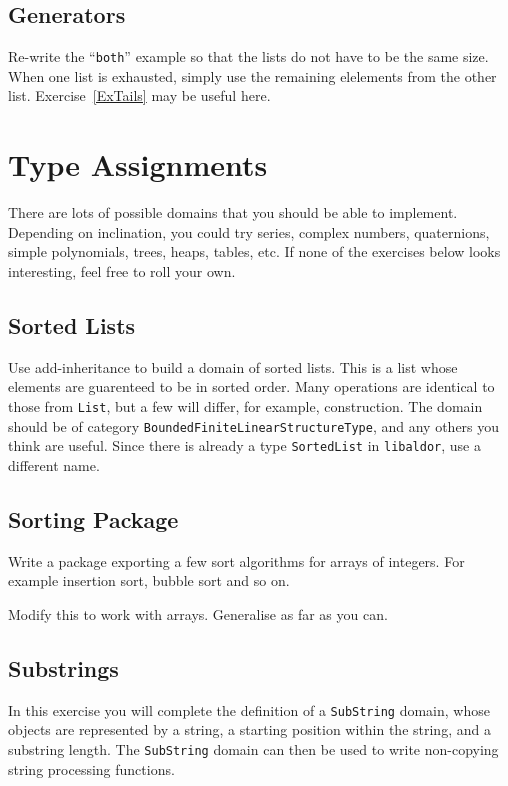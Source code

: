 \documentclass{article}
\newcommand{\libaldor}{{\tt libaldor}}
\begin{document}
\subsection{Generators}
Re-write the ``{\tt both}'' example so that the lists do not have to
be the same size.  When one list is exhausted, simply use the
remaining elelements from the other list.
Exercise~\ref{ExTails} may be useful here. 


\section{Type Assignments}

There are lots of possible domains that you should be able to
implement.  Depending on inclination, you could try series, complex
numbers, quaternions, simple polynomials, trees, heaps, tables, etc.
If none of the exercises below looks interesting, feel free to roll
your own.

\subsection{Sorted Lists}

Use add-inheritance to build a domain of sorted lists.  This is a list
whose elements are guarenteed to be in sorted order.  Many operations
are identical to those from {\tt List}, but a few will differ, for
example, construction.  The domain should be of category
{\tt BoundedFiniteLinearStructureType}, and any others you think are useful.
Since there is already a type {\tt SortedList} in \libaldor{}, use a different
name.

\subsection{Sorting Package}

Write a package exporting a few sort algorithms for arrays of
integers.  For example insertion sort, bubble sort and so on.

Modify this to work with arrays.  Generalise as far as you can.

\subsection{Substrings}

In this exercise you will complete the definition of a \verb+SubString+
domain, whose objects are represented by a string,
a starting position within the string, and a substring length.
The \verb+SubString+ domain can then be used to write non-copying
string processing functions.
\end{document}
